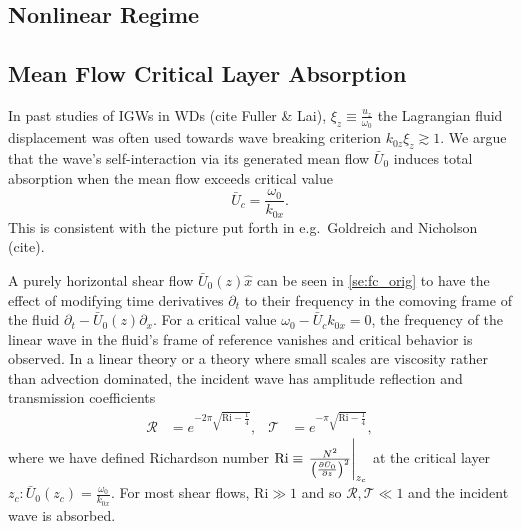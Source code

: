 \documentclass[twocolumn,
        nofootinbib, %
        usenames, %
        aps,
        prd,
        dvipsnames %
    ]{revtex4-1}%
\newcommand*{\pd}[2]{\frac{\partial#1}{\partial#2}}
\newcommand*{\at}[1]{\left.#1\right|}
\DeclarePairedDelimiter\p{\lparen}{\rparen}
\begin{document}
\subsection{Nonlinear Regime}\label{s:nonlin}

\subsection{Mean Flow Critical Layer Absorption}

In past studies of IGWs in WDs (cite Fuller \& Lai), $\xi_z \equiv
\frac{u_z}{\omega_0}$ the Lagrangian fluid displacement was often used towards
wave breaking criterion $k_{0z}\xi_z \gtrsim 1$. We argue that the wave's
self-interaction via its generated mean flow $\bar{U}_0$ induces total
absorption when the mean flow exceeds critical value
\begin{equation}
    \bar{U}_c = \frac{\omega_0}{k_{0x}}.
\end{equation}
This is consistent with the picture put forth in e.g.\ Goldreich and Nicholson
(cite).

A purely horizontal shear flow $\bar{U}_0(z) \hat{x}$ can be seen in
\autoref{se:fc_orig} to have the effect of modifying time derivatives
$\partial_t$ to their frequency in the comoving frame of the fluid $\partial_t -
\bar{U}_0(z)\partial_x$. For a critical value $\omega_0 - \bar{U}_c k_{0x} = 0$,
the frequency of the linear wave in the fluid's frame of reference vanishes and
critical behavior is observed. In a linear theory or a theory where small scales
are viscosity rather than advection dominated, the incident wave has amplitude
reflection and transmission coefficients
\begin{align}
    \mathcal{R} &= e^{-2\pi \sqrt{\mathrm{Ri} - \frac{1}{4}}}, &
    \mathcal{T} &= e^{-\pi \sqrt{\mathrm{Ri} - \frac{1}{4}}},
    \label{eq:crit_coeffs}
\end{align}
where we have defined Richardson number $\mathrm{Ri} \equiv
\at{\frac{N^2}{\p*{\pd{\bar{U}_0}{z}}^2}}_{z_c}$ at the critical layer $z_c:
\bar{U}_0(z_c) = \frac{\omega_0}{k_{0x}}$. For most shear flows, $\mathrm{Ri}
\gg 1$ and so $\mathcal{R}, \mathcal{T} \ll 1$ and the incident wave is
absorbed.
\end{document}
